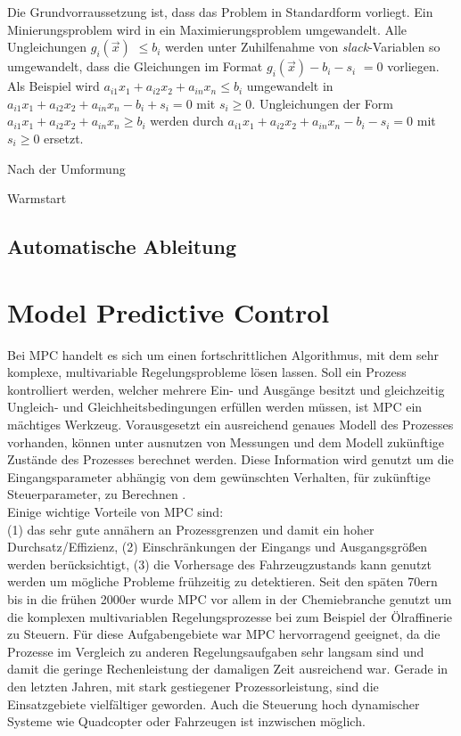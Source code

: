 \documentclass{like}
\begin{document}
 Die Grundvorraussetzung ist, dass das Problem in Standardform vorliegt. Ein Minierungsproblem wird in ein Maximierungsproblem umgewandelt.
 Alle Ungleichungen $g_i(\vec{x})$ $\leq b_i$ werden unter Zuhilfenahme von \textit{slack}-Variablen so umgewandelt, dass die Gleichungen im Format $g_i(\vec{x}) - b_i -s_i$ $=  0$ vorliegen. \\
 Als Beispiel wird $a_{i1}x_1 + a_{i2} x_2 + a_{in} x_n\leq b_i$ umgewandelt in 
 $a_{i1} x_1 + a_{i2} x_2 + a_{in} x_n - b_i +s_i = 0$ mit $s_i \geq 0$. Ungleichungen der Form $a_{i1} x_1 + a_{i2} x_2 + a_{in} x_n\geq b_i$ werden  durch  
 $a_{i1}x_1 + a_{i2} x_2 + a_{in} x_n - b_i - s_i = 0$ mit $s_i \geq 0$ ersetzt.

 Nach der Umformung 

 

  
 
   

   
   Warmstart

 
\subsection{Automatische Ableitung}
 
 
 
 
\section{Model Predictive Control}
Bei \ac{MPC} handelt es sich um einen fortschrittlichen Algorithmus, mit dem sehr komplexe, multivariable Regelungsprobleme lösen lassen. Soll ein Prozess kontrolliert werden, welcher mehrere Ein- und Ausgänge besitzt und gleichzeitig Ungleich- und Gleichheitsbedingungen erfüllen werden müssen, ist \acs{MPC} ein mächtiges Werkzeug. Vorausgesetzt ein ausreichend genaues Modell des Prozesses vorhanden, können unter ausnutzen von Messungen und dem Modell zukünftige Zustände des Prozesses berechnet werden. Diese Information wird genutzt um die Eingangsparameter abhängig von dem gewünschten Verhalten, für zukünftige Steuerparameter, zu Berechnen \cite{seborg2010process}. \\
Einige wichtige Vorteile von \ac{MPC} sind: \\
(1) das sehr gute annähern an Prozessgrenzen und damit ein hoher Durchsatz/Effizienz, (2) Einschränkungen der Eingangs und Ausgangsgrößen werden berücksichtigt, (3) die Vorhersage des Fahrzeugzustands kann genutzt werden um mögliche Probleme frühzeitig zu detektieren.
Seit den späten 70ern bis in die frühen 2000er wurde \ac{MPC} vor allem in der Chemiebranche genutzt um die komplexen multivariablen Regelungsprozesse bei zum Beispiel der Ölraffinerie zu Steuern. Für diese Aufgabengebiete war \acl{MPC} hervorragend geeignet, da die Prozesse im Vergleich zu anderen Regelungsaufgaben sehr langsam sind und damit die geringe Rechenleistung der damaligen Zeit ausreichend war. 
Gerade in den letzten Jahren, mit stark gestiegener Prozessorleistung, sind die Einsatzgebiete vielfältiger geworden. Auch die Steuerung hoch dynamischer Systeme wie Quadcopter \cite{quadcopterMpc} oder Fahrzeugen \cite{carMPC} ist inzwischen möglich. 
\end{document}
